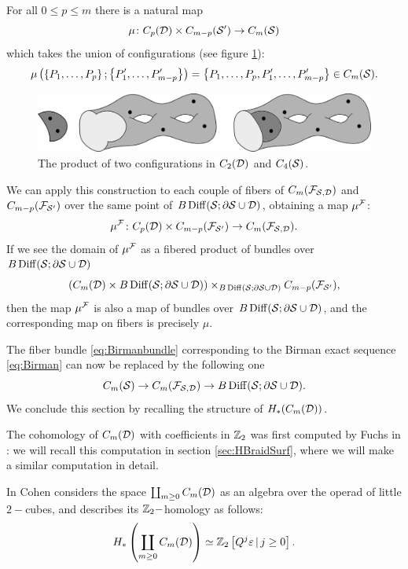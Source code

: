 \begin{defn}
For all $0\leq p\leq m$ there is a natural map
\[
 \mu\colon C_p(\D)\times C_{m-p}(\S')\to \cms
\]
which takes the union of configurations (see figure \ref{fig:defmu}):
 \[
  \mu\pa{\set{P_1,\dots,P_p};\set{P'_1,\dots,P'_{m-p}}}=\set{P_1,\dots,P_p,P'_1,\dots,P'_{m-p}}\in\cms.
 \]
\begin{figure}\centering
 \includegraphics[scale=0.7]{figures/defmu.png}
 \caption{The product of two configurations in $C_2(\D)$ and $C_4(\S)$.}
\label{fig:defmu}
\end{figure}
 
We can apply this construction to each couple of fibers of $C_m(\cF_{\S,\D})$ and $C_{m-p}(\cF_{\S'})$
over the same point of $ B\Diff(\S;\partial\S\cup\D)$, obtaining a map $\mu^{\cF}$:
\[
 \mu^{\cF}\colon C_p(\D)\times C_{m-p}(\cF_{\S'})\to C_m(\cF_{\S,\D}).
\]
If we see the domain of $\mu^{\cF}$ as a fibered product of bundles over $B\Diff(\S;\partial\S\cup\D)$
\[
 \pa{C_m(\D)\times B\Diff(\S;\partial\S\cup\D)}\times_{B\Diff(\S;\partial\S\cup\D)}C_{m-p}(\cF_{\S'}),
\]
then the map $\mu^{\cF}$ is also a map of bundles over $B\Diff(\S;\partial\S\cup\D)$, and the corresponding
map on fibers is precisely $\mu$.
\end{defn}
The fiber bundle \ref{eq:Birmanbundle} corresponding to the Birman exact sequence \ref{eq:Birman}
can now be replaced by the following one
\begin{equation}\label{eq:BirmanbundleD}
\cms\to C_m(\cF_{\S,\D})\to B\Diff(\S;\partial\S\cup\D).
\end{equation}
We conclude this section by recalling the structure of $H_*(C_m(\D))$.

The cohomology of $C_m(\D)$ with coefficients in $\Z_2$ was first computed by Fuchs in
\cite{Fuchs:CohomBraidModtwo}: we will recall this computation in section
\ref{sec:HBraidSurf}, where we will make a similar computation in detail.

In \cite[Chap.III]{CLM} Cohen considers the space $\coprod_{m\geq 0}C_m(\D)$ as an
algebra over the operad of little $2-$cubes, and describes its
$\Z_2-$homology as follows:
\begin{equation}
 \label{eq:Cohen}
H_*\pa{\coprod_{m\geq 0}C_m(\D)}\simeq \Z_2\left[Q^j\epsilon \, |\, j\geq 0\right].
\end{equation}

